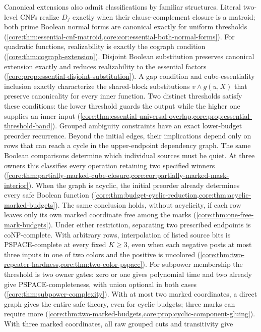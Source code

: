 Canonical extensions also admit classifications by familiar structures. Literal
two-level CNFs realize $D_f$ exactly when their clause-complement closure
is a matroid; both prime Boolean normal forms are canonical exactly for
uniform thresholds
(\cref{core:thm:essential-cnf-matroid,core:cor:essential-both-normal-forms}).
For quadratic functions, realizability is exactly the cograph condition
(\cref{core:thm:cograph-extension}). Disjoint Boolean substitution
preserves canonical extension exactly and reduces realizability to the
essential factors (\cref{core:prop:essential-disjoint-substitution}).
A gap condition and cube-essentiality inclusion exactly characterize
the shared-block substitutions $v\wedge g(u,X)$ that preserve canonicality
for every inner function. Two distinct thresholds satisfy these conditions:
the lower threshold guards the output while the higher one supplies an
inner input
(\cref{core:thm:essential-universal-overlap,core:prop:essential-threshold-band}).
Grouped ambiguity constraints have an exact lower-budget preorder
recurrence. Beyond the initial edges, their implications depend only on
rows that can reach a cycle in the upper-endpoint dependency graph.
The same Boolean comparisons determine which individual sources must be quiet.
At three owners this classifies every operation retaining two specified
winners (\cref{core:thm:partially-marked-cube-closure,core:cor:partially-marked-mask-interior}).
When the graph is acyclic, the initial preorder already determines
every safe Boolean function
(\cref{core:thm:budget-cyclic-reduction,core:thm:acyclic-marked-budgets}).
The same conclusion holds, without acyclicity, if each row leaves only
its own marked coordinate free among the marks
(\cref{core:thm:one-free-mark-budgets}).
Under either restriction, separating two prescribed endpoints is
coNP-complete. With arbitrary rows, interpolation of listed source
bits is PSPACE-complete at every fixed $K\ge3$, even when each negative
posts at most three inputs in one of two colors and the positive is uncolored
(\cref{core:thm:two-repeater-hardness,core:thm:two-color-pspace}).
For subpower membership the threshold is two owner gates: zero or one
gives polynomial time and two already give PSPACE-completeness, with
union optional in both cases (\cref{core:thm:subpower-complexity}).
With at most two marked coordinates, a direct graph gives the entire
safe theory, even for cyclic budgets; three marks can require more
(\cref{core:thm:two-marked-budgets,core:prop:cyclic-component-gluing}).
With three marked coordinates, all raw grouped cuts and transitivity give
